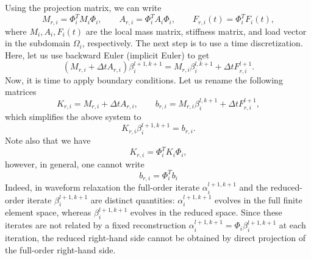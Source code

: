 \documentclass[a4paper, 11pt]{article}
\theoremstyle{plain}
\theoremstyle{definition}
\theoremstyle{remark}
\begin{document}
Using the projection matrix, we can write
\begin{equation*}
    M_{r, i} = \Phi_{i}^{T}M_{i}\Phi_{i}, \qquad A_{r, i} = \Phi_{i}^{T}A_{i}\Phi_{i}, \qquad F_{r, i}(t) = \Phi_{i}^{T}F_{i}(t),
\end{equation*}
where $M_{i}, A_{i}, F_{i}(t)$ are the local mass matrix, stiffness matrix, and load vector in the subdomain $\Omega_{i}$, respectively.
The next step is to use a time discretization. Here, let us use backward Euler (implicit Euler) to get
\begin{equation*}
    \left(M_{r, i} + \Delta t A_{r, i}\right)\beta_{i}^{l+1, k+1} = M_{r, i} \beta_{i}^{l, k+1} + \Delta tF_{r, i}^{l+1}.
\end{equation*}
Now, it is time to apply boundary conditions. Let us rename the following matrices
\begin{equation*}
    K_{r, i} = M_{r, i} + \Delta t A_{r, i}, \qquad b_{r, i} = M_{r, i} \beta_{i}^{l, k+1} + \Delta tF_{r, i}^{l+1}, 
\end{equation*}
which simplifies the above system to
\begin{equation*}
    K_{r, i}\beta_{i}^{l+1, k+1} = b_{r, i}.
\end{equation*}
Note also that we have
\begin{equation*}
    K_{r, i} = \Phi_{i}^{T}K_{i}\Phi_{i},
\end{equation*}
however, in general, one cannot write
\begin{equation*}
    b_{r, i} = \Phi_{i}^{T}b_{i}
\end{equation*}
Indeed, in waveform relaxation the full-order iterate $\alpha_i^{l+1, k+1}$ and the 
reduced-order iterate $\beta_i^{l+1, k+1}$ are distinct quantities: $\alpha_i^{l+1, k+1}$ evolves 
in the full finite element space, whereas $\beta_i^{l+1, k+1}$ evolves in the reduced space. 
Since these iterates are not related by a fixed reconstruction $\alpha_i^{l+1, k+1} = \Phi_i \beta_i^{l+1, k+1}$ at each iteration, the reduced right-hand side cannot be obtained by direct projection of the full-order right-hand side.
\end{document}
